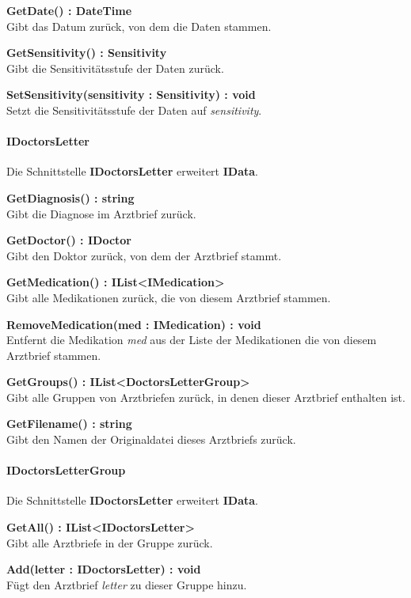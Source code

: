 \documentclass[a4paper]{scrreprt}
\begin{document}
\textbf{GetDate() : DateTime}\\
Gibt das Datum zurück, von dem die Daten stammen.

\textbf{GetSensitivity() : Sensitivity}\\
Gibt die Sensitivitätsstufe der Daten zurück.

\textbf{SetSensitivity(sensitivity : Sensitivity) : void}\\
Setzt die Sensitivitätsstufe der Daten auf \textit{sensitivity}.

\paragraph{IDoctorsLetter}
Die Schnittstelle \textbf{IDoctorsLetter} erweitert \textbf{IData}.

\textbf{GetDiagnosis() : string}\\
Gibt die Diagnose im Arztbrief zurück.

\textbf{GetDoctor() : IDoctor}\\
Gibt den Doktor zurück, von dem der Arztbrief stammt.

\textbf{GetMedication() : IList<IMedication>}\\
Gibt alle Medikationen zurück, die von diesem Arztbrief stammen.

\textbf{RemoveMedication(med : IMedication) : void}\\
Entfernt die Medikation \textit{med} aus der Liste der Medikationen die von diesem Arztbrief stammen.

\textbf{GetGroups() : IList<DoctorsLetterGroup>}\\
Gibt alle Gruppen von Arztbriefen zurück, in denen dieser Arztbrief enthalten ist.

\textbf{GetFilename() : string}\\
Gibt den Namen der Originaldatei dieses Arztbriefs zurück.

\paragraph{IDoctorsLetterGroup}
Die Schnittstelle \textbf{IDoctorsLetter} erweitert \textbf{IData}.

\textbf{GetAll() : IList<IDoctorsLetter>}\\
Gibt alle Arztbriefe in der Gruppe zurück.

\textbf{Add(letter : IDoctorsLetter) : void}\\
Fügt den Arztbrief \textit{letter} zu dieser Gruppe hinzu.
\end{document}
